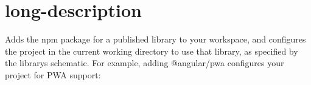 \chapter{long-\/description}
\hypertarget{md__d_1_2_g_i_t_2_food_link_2foodlink_8client_2node__modules_2_0dangular_2cli_2src_2commands_2add_2long-description}{}\label{md__d_1_2_g_i_t_2_food_link_2foodlink_8client_2node__modules_2_0dangular_2cli_2src_2commands_2add_2long-description}
Adds the npm package for a published library to your workspace, and configures the project in the current working directory to use that library, as specified by the library\textquotesingle{}s schematic. For example, adding {\ttfamily @angular/pwa} configures your project for PWA support\+:


\begin{DoxyCode}{0}

\end{DoxyCode}
 
